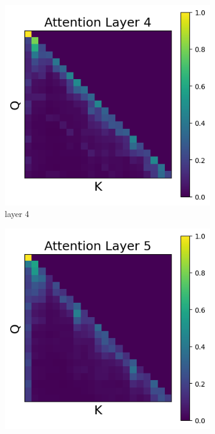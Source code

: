 \documentclass[11pt]{article}
\begin{document}
\begin{figure}[t]
  \begin{subfigure}[t]{0.24\textwidth}
    \centering
    \includegraphics[width=1.4\columnwidth]{figures/intervention1/layer_4.png}
    \caption{layer 4}
  \end{subfigure}\hfill
  \begin{subfigure}[t]{0.24\textwidth}
    \centering
    \includegraphics[width=1.4\columnwidth]{figures/intervention1/layer_5.png}

\end{subfigure}
\end{figure}
\end{document}
